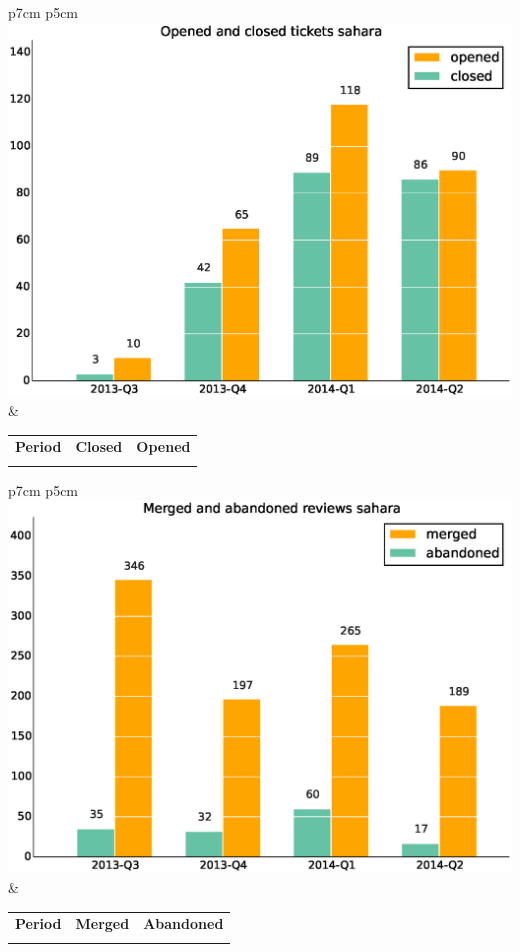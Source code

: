\documentclass[a4wide,11pt]{report}
\begin{document}
\begin{tabular}{p{7cm} p{5cm}}
    \vspace{0pt} 
    \includegraphics[scale=.35]{figs/closedsahara.eps}
    & 
    \vspace{0pt}
    \begin{tabular}{l|r|r|}%
\bfseries Period & \bfseries Closed & \bfseries Opened
    \csvreader[head to column names]{data/closedsahara.csv}{}%
    {\\ & \closed & \opened}
    \end{tabular}
\end{tabular}

\begin{tabular}{p{7cm} p{5cm}}
    \vspace{0pt} 
    \includegraphics[scale=.35]{figs/submitted_reviewssahara.eps}
    & 
    \vspace{0pt}
    \begin{tabular}{l|r|r|}%
    \bfseries Period & \bfseries Merged & \bfseries Abandoned %
    \csvreader[head to column names]{data/submitted_reviewssahara.csv}{}%
    {\\ & \merged & \abandoned}
    \end{tabular}
\end{tabular}
\end{document}
